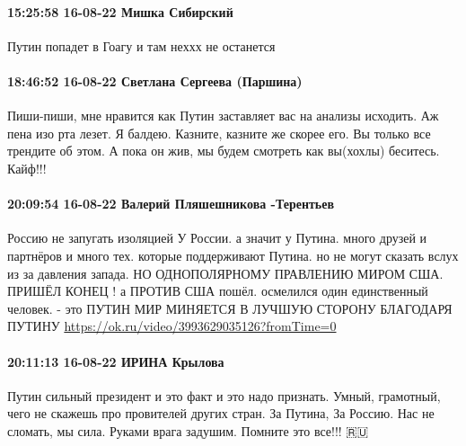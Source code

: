  
 
 
 
 

\paragraph{15:25:58 16-08-22 Мишка Сибирский}

Путин попадет в Гоагу и там неххх не останется

\paragraph{18:46:52 16-08-22 Светлана Сергеева (Паршина)}

Пиши-пиши, мне нравится как Путин заставляет вас на анализы исходить. Аж пена
изо рта лезет. Я балдею. Казните, казните же скорее его. Вы только все трендите
об этом. А пока он жив, мы будем смотреть как вы(хохлы) беситесь. Кайф!!!

\paragraph{20:09:54 16-08-22 Валерий Пляшешникова -Терентьев}

Россию не запугать изоляцией У России. а значит у Путина. много друзей и
партнёров и много тех. которые поддерживают Путина. но не могут сказать вслух
из за давления запада. НО ОДНОПОЛЯРНОМУ ПРАВЛЕНИЮ МИРОМ США. ПРИШЁЛ КОНЕЦ ! а
ПРОТИВ США пошёл. осмелился один единственный человек. - это ПУТИН МИР МИНЯЕТСЯ
В ЛУЧШУЮ СТОРОНУ БЛАГОДАРЯ ПУТИНУ \url{https://ok.ru/video/3993629035126?fromTime=0}

\paragraph{20:11:13 16-08-22 ИРИНА Крылова}

Путин сильный президент и это факт и это надо признать. Умный, грамотный, чего
не скажешь про провителей других стран. За Путина, За Россию. Нас не сломать,
мы сила. Руками врага задушим. Помните это все!!! 🇷🇺🤛
